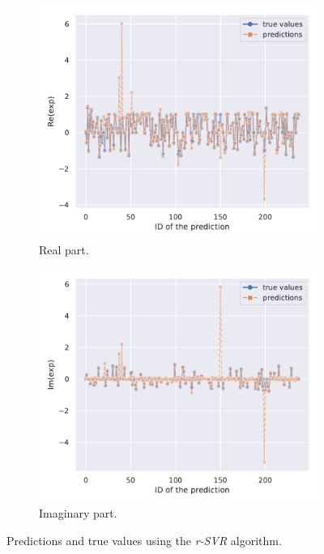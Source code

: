 \begin{figure}[htbp]
  \centering
  \begin{subfigure}{0.45\textwidth}
    \centering
    \includegraphics[width=\linewidth]{img/svr_test_exp_re_plot}
    \caption{Real part.}
  \end{subfigure}
  \begin{subfigure}{0.45\textwidth}
    \centering
    \includegraphics[width=\linewidth]{img/svr_test_exp_im_plot}
    \caption{Imaginary part.}
  \end{subfigure}
  \caption{Predictions and true values using the \emph{r-SVR} algorithm.}
  \label{fig:agg:svr_pred}
\end{figure}

